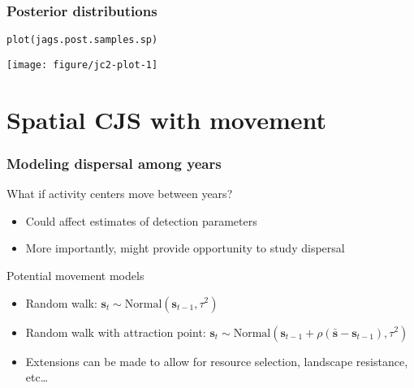 \documentclass[color=usenames,dvipsnames]{beamer}\usepackage[]{graphicx}\usepackage[]{color}
\makeatletter
\newcommand{\hlstd}[1]{\textcolor[rgb]{0,0,0}{#1}}%
\newcommand{\hlkwd}[1]{\textcolor[rgb]{0.004,0.004,0.506}{#1}}%
\newenvironment{kframe}{%
 \def\at@end@of@kframe{}%
 \ifinner\ifhmode%
  \def\at@end@of@kframe{\end{minipage}}%
  \begin{minipage}{\columnwidth}%
 \fi\fi%
 \def\FrameCommand##1{\hskip\@totalleftmargin \hskip-\fboxsep
 \colorbox{shadecolor}{##1}\hskip-\fboxsep
     \hskip-\linewidth \hskip-\@totalleftmargin \hskip\columnwidth}%
 \MakeFramed {\advance\hsize-\width
   \@totalleftmargin\z@ \linewidth\hsize
   \@setminipage}}%
 {\par\unskip\endMakeFramed%
 \at@end@of@kframe}
\newenvironment{knitrout}{}{} %
\makeatother
\begin{document}
\begin{frame}[fragile]
  \frametitle{Posterior distributions}
\begin{knitrout}\scriptsize
{}\color{fgcolor}\begin{kframe}
\begin{alltt}
\hlkwd{plot}\hlstd{(jags.post.samples.sp)}
\end{alltt}
\end{kframe}

{\centering \texttt{[image: figure/jc2-plot-1]} 

}


\end{knitrout}
\end{frame}










\section{Spatial CJS with movement}









\begin{frame}
  \frametitle{Modeling dispersal among years}
  {\large What if activity centers move between years?}
  \begin{itemize}
    \normalsize
    \item Could affect estimates of detection parameters
    \item More importantly, might provide opportunity to study dispersal
  \end{itemize}
  \pause
  \vfill
  {\large Potential movement models}
  \begin{itemize}
    \normalsize
    \item Random walk: ${\bm s}_t \sim \mbox{Normal}({\bm s}_{t-1}, \tau^2)$
    \item Random walk with attraction point: ${\bm s}_t \sim \mbox{Normal}({\bm  s}_{t-1} + \rho(\bar{\bm s} - {\bm s}_{t-1}), \tau^2)$
    \item Extensions can be made to allow for resource selection,
      landscape resistance, etc\dots 
  \end{itemize}
\end{frame}
\end{document}

